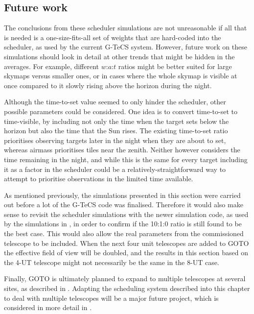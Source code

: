 \subsection{Future work}
\label{sec:scheduler_sim_future}
\begin{colsection}

The conclusions from these scheduler simulations are not unreasonable if all that is needed is a one-size-fits-all set of weights that are hard-coded into the scheduler, as used by the current G-TeCS system. However, future work on these simulations should look in detail at other trends that might be hidden in the averages. For example, different $w$:$a$:$t$ ratios might be better suited for large skymaps versus smaller ones, or in cases where the whole skymap is visible at once compared to it slowly rising above the horizon during the night.

Although the time-to-set value seemed to only hinder the scheduler, other possible parameters could be considered. One idea is to convert time-to-set to time-visible, by including not only the time when the target sets below the horizon but also the time that the Sun rises. The existing time-to-set ratio prioritises observing targets later in the night when they are about to set, whereas airmass prioritises tiles near the zenith. Neither however considers the time remaining in the night, and while this is the same for every target including it as a factor in the scheduler could be a relatively-straightforward way to attempt to prioritise observations in the limited time available.

As mentioned previously, the simulations presented in this section were carried out before a lot of the G-TeCS code was finalised. Therefore it would also make sense to revisit the scheduler simulations with the newer simulation code, as used by the simulations in , in order to confirm if the 10:1:0 ratio is still found to be the best case. This would also allow the real parameters from the commissioned telescope to be included. When the next four unit telescopes are added to GOTO the effective field of view will be doubled, and the results in this section based on the 4-UT telescope might not necessarily be the same in the 8-UT case.

Finally, GOTO is ultimately planned to expand to multiple telescopes at several sites, as described in . Adapting the scheduling system described into this chapter to deal with multiple telescopes will be a major future project, which is considered in more detail in .

\end{colsection}

